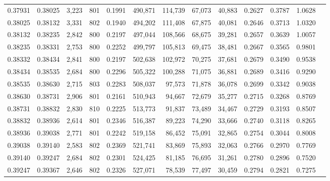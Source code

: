 \begin{tabular}{rrrrrrrrrrrrr}
0.37931 & 0.38025 &  3,223 & 801 &                                     0.1991 & 490,871 & 114,739 &  67,073 &  40,883 & 0.2627 & 0.3787 & 1.0628 \\
0.38025 & 0.38132 &  3,331 & 802 &                                     0.1940 & 494,202 & 111,408 &  67,875 &  40,081 & 0.2646 & 0.3713 & 1.0320 \\
0.38132 & 0.38235 &  2,842 & 800 &                                     0.2197 & 497,044 & 108,566 &  68,675 &  39,281 & 0.2657 & 0.3639 & 1.0057 \\
0.38235 & 0.38331 &  2,753 & 800 &                                     0.2252 & 499,797 & 105,813 &  69,475 &  38,481 & 0.2667 & 0.3565 & 0.9801 \\
0.38332 & 0.38434 &  2,841 & 800 &                                     0.2197 & 502,638 & 102,972 &  70,275 &  37,681 & 0.2679 & 0.3490 & 0.9538 \\
0.38434 & 0.38535 &  2,684 & 800 &                                     0.2296 & 505,322 & 100,288 &  71,075 &  36,881 & 0.2689 & 0.3416 & 0.9290 \\
0.38535 & 0.38630 &  2,715 & 803 &                                     0.2283 & 508,037 &  97,573 &  71,878 &  36,078 & 0.2699 & 0.3342 & 0.9038 \\
0.38630 & 0.38731 &  2,906 & 801 &                                     0.2161 & 510,943 &  94,667 &  72,679 &  35,277 & 0.2715 & 0.3268 & 0.8769 \\
0.38731 & 0.38832 &  2,830 & 810 &                                     0.2225 & 513,773 &  91,837 &  73,489 &  34,467 & 0.2729 & 0.3193 & 0.8507 \\
0.38832 & 0.38936 &  2,614 & 801 &                                     0.2346 & 516,387 &  89,223 &  74,290 &  33,666 & 0.2740 & 0.3118 & 0.8265 \\
0.38936 & 0.39038 &  2,771 & 801 &                                     0.2242 & 519,158 &  86,452 &  75,091 &  32,865 & 0.2754 & 0.3044 & 0.8008 \\
0.39038 & 0.39140 &  2,583 & 802 &                                     0.2369 & 521,741 &  83,869 &  75,893 &  32,063 & 0.2766 & 0.2970 & 0.7769 \\
0.39140 & 0.39247 &  2,684 & 802 &                                     0.2301 & 524,425 &  81,185 &  76,695 &  31,261 & 0.2780 & 0.2896 & 0.7520 \\
0.39247 & 0.39367 &  2,646 & 802 &                                     0.2326 & 527,071 &  78,539 &  77,497 &  30,459 & 0.2794 & 0.2821 & 0.7275 \\

\end{tabular}
